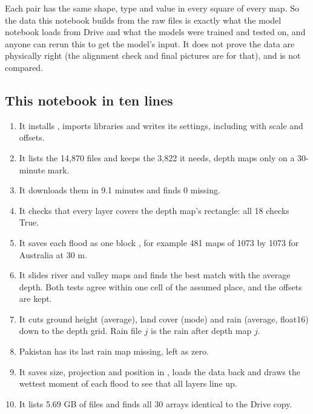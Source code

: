 \begin{plainbox}
Each pair has the same shape, type and value in every square of every map. So the data this notebook builds from the raw files is exactly what the model notebook loads from Drive and what the models were trained and tested on, and anyone can rerun this to get the model's input. It does not prove the data are physically right (the alignment check and final pictures are for that), and  is not compared.
\end{plainbox}


\subsection{This notebook in ten lines}

\begin{enumerate}
\item It installs , imports libraries and writes its settings, including  with scale and offsets.
\item It lists the 14,870 files and keeps the 3,822 it needs, depth maps only on a 30-minute mark.
\item It downloads them in 9.1 minutes and finds 0 missing.
\item It checks that every layer covers the depth map's rectangle: all 18 checks True.
\item It saves each flood as one block , for example 481 maps of 1073 by 1073 for Australia at 30 m.
\item It slides river and valley maps and finds the best match with the average depth. Both tests agree within one cell of the assumed place, and the offsets are kept.
\item It cuts ground height (average), land cover (mode) and rain (average, float16) down to the depth grid. Rain file $j$ is the rain after depth map $j$.
\item Pakistan has its last rain map missing, left as zero.
\item It saves size, projection and position in , loads the data back and draws the wettest moment of each flood to see that all layers line up.
\item It lists 5.69 GB of files and finds all 30 arrays identical to the Drive copy.
\end{enumerate}
\endgroup
